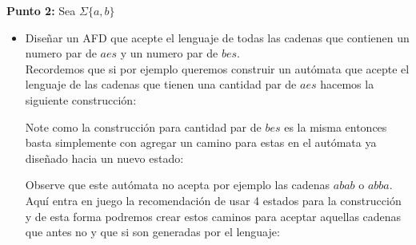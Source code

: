     \textbf{Punto 2: }Sea $\Sigma\{a,b\}$
\begin{itemize}[label={$\bullet$}]
    \item Diseñar un AFD que acepte el lenguaje de todas las cadenas que contienen un numero par de $aes$ y un numero par de $bes$.\\

     Recordemos que si por ejemplo queremos construir un autómata que acepte el lenguaje de las cadenas que tienen una cantidad par de $aes$ hacemos la siguiente construcción:
    \begin{basedtikz}
    \centering
    \end{basedtikz}
Note como la construcción para cantidad par de $bes$ es la misma entonces basta simplemente con agregar un camino para estas en el autómata ya diseñado hacia un nuevo estado:
\begin{basedtikz}
\centering
    \end{basedtikz}

Observe que este autómata no acepta por ejemplo las cadenas $abab$ o $abba$. Aquí entra en juego la recomendación de usar 4 estados para la construcción y de esta forma podremos crear estos caminos para aceptar aquellas cadenas que antes no y que si son generadas por el lenguaje:


\end{itemize}
